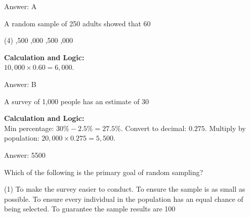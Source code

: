 \documentclass[11pt,paper=a4,answers]{exam}
\begin{document}
\begin{questions}
\begin{solution}
Answer: \colorbox{yellow!100}{A}
\end{solution}

\vspace{60pt}

\question
A random sample of 250 adults showed that 60%
\begin{tasks}(4)
    ,500
    ,000
    ,500
    ,000
\end{tasks}

\begin{solution}
\textbf{Calculation and Logic:} \\
$10,000 \times 0.60 = 6,000$.

\vspace{30pt}

Answer: \colorbox{yellow!100}{B}
\end{solution}

\vspace{60pt}

\question
A survey of 1,000 people has an estimate of 30%

\begin{solution}
\textbf{Calculation and Logic:} \\
Min percentage: $30\% - 2.5\% = 27.5\%$. Convert to decimal: $0.275$. Multiply by population: $20,000 \times 0.275 = 5,500$.

\vspace{30pt}

Answer: \colorbox{yellow!100}{5500}
\end{solution}

\vspace{60pt}

\question
Which of the following is the primary goal of random sampling?
\begin{tasks}(1)
    \task To make the survey easier to conduct.
    \task To ensure the sample is as small as possible.
    \task To ensure every individual in the population has an equal chance of being selected.
    \task To guarantee the sample results are 100%
\end{tasks}


\end{questions}
\end{document}
